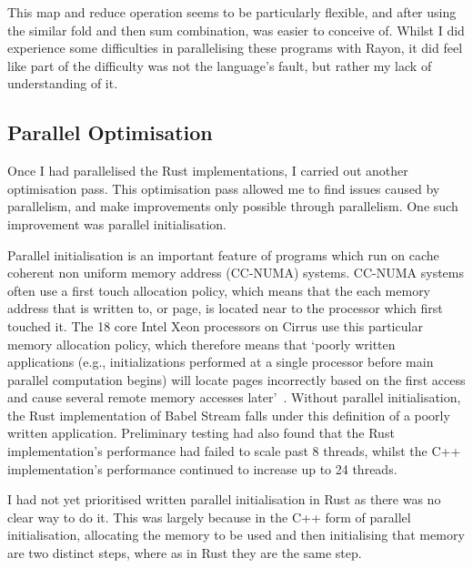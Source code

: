 This map and reduce operation seems to be particularly flexible, and after using the similar fold and then sum combination, was easier to conceive of. Whilst I did experience some difficulties in parallelising these programs with Rayon, it did feel like part of the difficulty was not the language's fault, but rather my lack of understanding of it.


\subsection{Parallel Optimisation}
Once I had parallelised the Rust implementations, I carried out another optimisation pass. This optimisation pass allowed me to find issues caused by parallelism, and make improvements only possible through parallelism. One such improvement was parallel initialisation.

Parallel initialisation is an important feature of programs which run on cache coherent non uniform memory address (CC-NUMA) systems. CC-NUMA systems often use a first touch allocation policy, which means that the each memory address that is written to, or page, is located near to the processor which first touched it. The 18 core Intel Xeon processors on Cirrus use this particular memory allocation policy, which therefore means that `poorly written applications (e.g., initializations  performed  at  a  single  processor  before  main  parallel computation  begins)  will  locate  pages  incorrectly based  on  the  first  access  and  cause  several  remote memory accesses later'~\cite{Bhuyan:2000}. Without parallel initialisation, the Rust implementation of Babel Stream falls under this definition of a poorly written application. Preliminary testing had also found that the Rust implementation's performance had failed to scale past 8 threads, whilst the C++ implementation's performance continued to increase up to 24 threads. 

I had not yet prioritised written parallel initialisation in Rust as there was no clear way to do it. This was largely because in the C++ form of parallel initialisation, allocating the memory to be used and then initialising that memory are two distinct steps, where as in Rust they are the same step.

